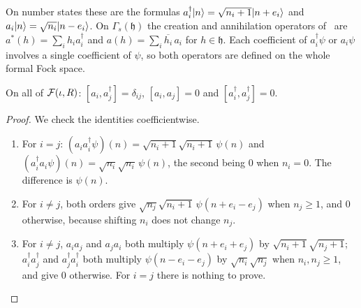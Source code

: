 On number states these are the formulas $a_i^\dagger\lvert n\rangle=\sqrt{n_i+1}\lvert n+e_i\rangle$ and
$a_i\lvert n\rangle=\sqrt{n_i}\lvert n-e_i\rangle$. On $\Gamma_s(\mathfrak h)$ the creation and annihilation
operators of~ are $a^*(h)=\sum_ih_ia_i^\dagger$ and $a(h)=\sum_i\overline{h_i}\,a_i$
for $h\in\mathfrak h$. Each coefficient of $a_i^\dagger\psi$ or $a_i\psi$ involves a single
coefficient of $\psi$, so both operators are defined on the whole formal Fock space.

\begin{theorem}\label{thm:fock-ccr}
On all of $\mathcal F(\iota,R)$: $[a_i,a_j^\dagger]=\delta_{ij}$, $[a_i,a_j]=0$ and
$[a_i^\dagger,a_j^\dagger]=0$.
\end{theorem}

\begin{proof}
We check the identities coefficientwise.
\begin{enumerate}
\item[(a)] For $i=j$: $(a_ia_i^\dagger\psi)(n)=\sqrt{n_i+1}\sqrt{n_i+1}\,\psi(n)$ and
$(a_i^\dagger a_i\psi)(n)=\sqrt{n_i}\sqrt{n_i}\,\psi(n)$, the second being $0$ when $n_i=0$.
The difference is $\psi(n)$.
\item[(b)] For $i\ne j$, both orders give $\sqrt{n_j}\sqrt{n_i+1}\,\psi(n+e_i-e_j)$ when
$n_j\ge1$, and $0$ otherwise, because shifting $n_i$ does not change $n_j$.
\item[(c)] For $i\ne j$, $a_ia_j$ and $a_ja_i$ both multiply $\psi(n+e_i+e_j)$ by
$\sqrt{n_i+1}\sqrt{n_j+1}$; $a_i^\dagger a_j^\dagger$ and $a_j^\dagger a_i^\dagger$ both
multiply $\psi(n-e_i-e_j)$ by $\sqrt{n_i}\sqrt{n_j}$ when $n_i,n_j\ge1$, and give $0$
otherwise. For $i=j$ there is nothing to prove.\qedhere
\end{enumerate}
\end{proof}



